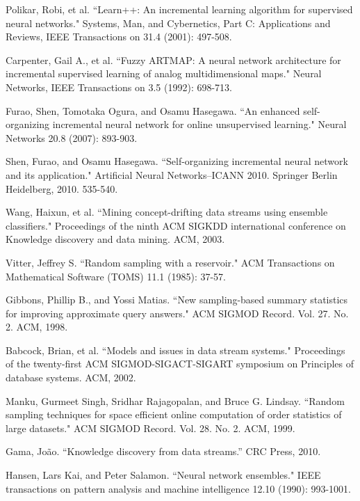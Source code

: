 \documentclass[conference]{IEEEtran}
\begin{document}
\begin{thebibliography}{9}
			Polikar, Robi, et al. ``Learn++: An incremental learning algorithm for supervised neural networks." Systems, Man, and Cybernetics, Part C: Applications and Reviews, IEEE Transactions on 31.4 (2001): 497-508.
			
			Carpenter, Gail A., et al. ``Fuzzy ARTMAP: A neural network architecture for incremental supervised learning of analog multidimensional maps." Neural Networks, IEEE Transactions on 3.5 (1992): 698-713.
			
			Furao, Shen, Tomotaka Ogura, and Osamu Hasegawa. ``An enhanced self-organizing incremental neural network for online unsupervised learning." Neural Networks 20.8 (2007): 893-903.
			
			Shen, Furao, and Osamu Hasegawa. ``Self-organizing incremental neural network and its application." Artificial Neural Networks–ICANN 2010. Springer Berlin Heidelberg, 2010. 535-540.
			
			Wang, Haixun, et al. ``Mining concept-drifting data streams using ensemble classifiers." Proceedings of the ninth ACM SIGKDD international conference on Knowledge discovery and data mining. ACM, 2003.
			
				Vitter, Jeffrey S. ``Random sampling with a reservoir." ACM Transactions on Mathematical Software (TOMS) 11.1 (1985): 37-57.
				
				Gibbons, Phillip B., and Yossi Matias. ``New sampling-based summary statistics for improving approximate query answers." ACM SIGMOD Record. Vol. 27. No. 2. ACM, 1998.
				
				Babcock, Brian, et al. ``Models and issues in data stream systems." Proceedings of the twenty-first ACM SIGMOD-SIGACT-SIGART symposium on Principles of database systems. ACM, 2002.
				
				Manku, Gurmeet Singh, Sridhar Rajagopalan, and Bruce G. Lindsay. ``Random sampling techniques for space efficient online computation of order statistics of large datasets." ACM SIGMOD Record. Vol. 28. No. 2. ACM, 1999.

			Gama, João. ``Knowledge discovery from data streams.'' CRC Press, 2010.
			
			Hansen, Lars Kai, and Peter Salamon. ``Neural network ensembles." IEEE transactions on pattern analysis and machine intelligence 12.10 (1990): 993-1001.
				

\end{thebibliography}
\end{document}
